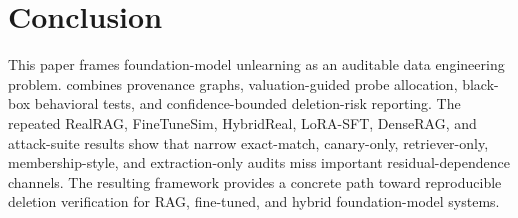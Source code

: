 \section{Conclusion}

This paper frames foundation-model unlearning as an auditable data engineering problem. \method{} combines provenance graphs, valuation-guided probe allocation, black-box behavioral tests, and confidence-bounded deletion-risk reporting. The repeated RealRAG, FineTuneSim, HybridReal, LoRA-SFT, DenseRAG, and attack-suite results show that narrow exact-match, canary-only, retriever-only, membership-style, and extraction-only audits miss important residual-dependence channels. The resulting framework provides a concrete path toward reproducible deletion verification for RAG, fine-tuned, and hybrid foundation-model systems.

